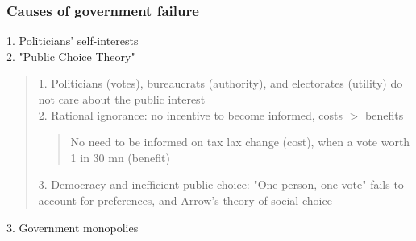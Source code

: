 \subsubsection{Causes of government failure}
1. Politicians' self-interests \\
2. "Public Choice Theory"
\begin{quote}
    1. Politicians (votes), bureaucrats (authority), and electorates (utility) do not care about the public interest \\
    2. Rational ignorance: no incentive to become informed, costs $>$ benefits
    \begin{quote}
        No need to be informed on tax lax change (cost), when a vote worth 1 in 30 mn (benefit)
    \end{quote}
    3. Democracy and inefficient public choice: "One person, one vote" fails to account for preferences, and Arrow's theory of social choice
\end{quote}
3. Government monopolies